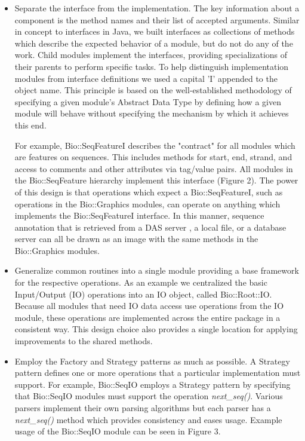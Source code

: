 \documentclass[12pt]{article}
\begin{document}
\begin{itemize}

\item Separate the interface from the implementation.  The key
information about a component is the method names and their list of
accepted arguments.  Similar in concept to interfaces in Java, we
built interfaces as collections of methods which describe the expected
behavior of a module, but do not do any of the work.  Child modules
implement the interfaces, providing specializations of their parents
to perform specific tasks.  To help distinguish implementation modules
from interface definitions we used a capital 'I' appended to the
object name.  This principle is based on the well-established
methodology of specifying a given module's Abstract Data Type by
defining how a given module will behave without specifying the
mechanism by which it achieves this end.

For example, Bio::SeqFeatureI describes the "contract" for all modules
which are features on sequences.  This includes methods for
start, end, strand, and access to comments and other attributes via tag/value
pairs.  All modules in the Bio::SeqFeature hierarchy implement this
interface (Figure 2).  The power of this design is that operations
which expect a Bio::SeqFeatureI, such as operations in the
Bio::Graphics modules, can operate on anything which implements the
Bio::SeqFeatureI interface.  In this manner, sequence annotation that
is retrieved from a DAS server \cite{das}, a local file, or a database
server can all be drawn as an image with the same methods in the
Bio::Graphics modules.

\item Generalize common routines into a single module providing a base
framework for the respective operations.  As an example we centralized
the basic Input/Output (IO) operations into an IO object, called
Bio::Root::IO.  Because all modules that need IO data access use
operations from the IO module, these operations are implemented across
the entire package in a consistent way.  This design choice also
provides a single location for applying improvements to the shared
methods.  


\item Employ the Factory and Strategy patterns \cite{gangoffour} as
much as possible.  A Strategy pattern defines one or more operations
that a particular implementation must support.  For example,
Bio::SeqIO employs a Strategy pattern by specifying that Bio::SeqIO
modules must support the operation \textit{next\_seq()}.  Various
parsers implement their own parsing algorithms but each parser has a
\textit{next\_seq()} method which provides consistency and eases
usage.  Example usage of the Bio::SeqIO module can be seen in Figure 3.


\end{itemize}
\end{document}
